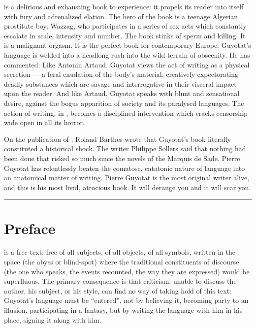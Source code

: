 \documentclass[10pt,twoside]{memoir}
\begin{document}
 is a delirious and exhausting book to experience: it propels its reader into itself with fury and adrenalized elation. The hero of the book is a teenage Algerian prostitute boy, Wazzag, who participates in a series of sex acts which constantly escalate in scale, intensity and number. The book stinks of sperm and killing. It is a malignant orgasm. It is the perfect book for contemporary Europe. Guyotat's language is welded into a headlong rush into the wild terrain of obscenity. He has commented:  Like Antonin Artaud, Guyotat views the act of writing as a physical secretion --- a feral exudation of the body's material, creatively expectorating deadly substances which are savage and interrogative in their visceral impact upon the reader. And like Artaud, Guyotat speaks with blunt and sensational desire, against the bogus apparition of society and its paralysed languages. The action of writing, in , becomes a disciplined intervention which cracks censorship wide open in all its horror.

On the publication of , Roland Barthes wrote that Guyotat's book literally constituted a historical shock. The writer Philippe Sollers said that nothing had been done that risked so much since the novels of the Marquis de Sade. Pierre Guyotat has relentlessly beaten the comatose, catatonic nature of language into an anatomical matter of writing. Pierre Guyotat is the most original writer alive, and this is his most livid, atrocious book. It will derange you and it will scar you.

\plainbreak{2}


\chapter{Preface}

 is a free text: free of all subjects, of all objects, of all symbols, written in the space (the abyss or blind-spot) where the traditional constituents of discourse (the one who speaks, the events recounted, the way they are expressed) would be superfluous. The primary consequence is that criticism, unable to discuss the author, his subject, or his style, can find no way of taking hold of this text: Guyotat's language must be \enquote{entered}, not by believing it, becoming party to an illusion, participating in a fantasy, but by writing the language with him in his place, signing it along with him.
\end{document}
